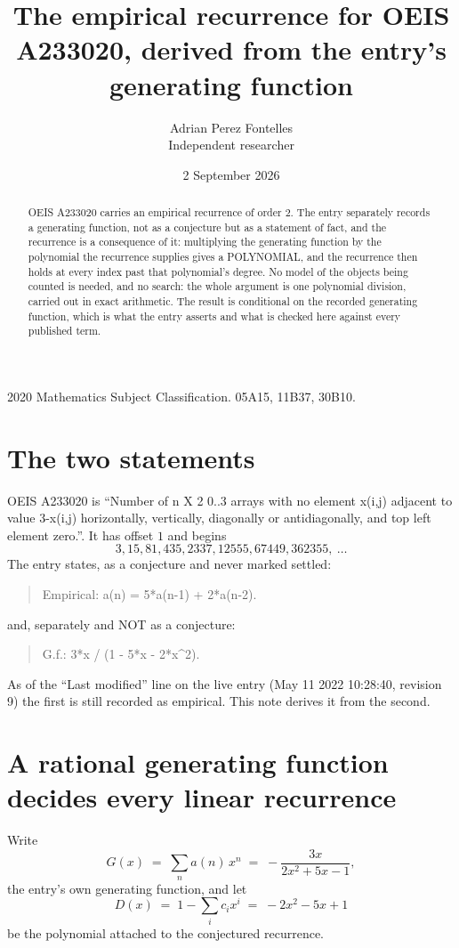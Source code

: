 \documentclass[11pt,a4paper]{article}
\title{The empirical recurrence for OEIS A233020, derived from the entry's generating function}
\author{Adrian Perez Fontelles\\ \small Independent researcher}
\date{2 September 2026}
\theoremstyle{plain}
\theoremstyle{definition}
\begin{document}
\maketitle

\begin{abstract}
OEIS A233020 carries an empirical recurrence of order $2$. The entry separately records a
generating function, not as a conjecture but as a statement of fact, and the recurrence is a
consequence of it: multiplying the generating function by the polynomial the recurrence
supplies gives a POLYNOMIAL, and the recurrence then holds at every index past that
polynomial's degree. No model of the objects being counted is needed, and no search: the
whole argument is one polynomial division, carried out in exact arithmetic. The result is
conditional on the recorded generating function, which is what the entry asserts and what is
checked here against every published term.
\end{abstract}

\noindent\small 2020 Mathematics Subject Classification. 05A15, 11B37, 30B10.\normalsize

\section{The two statements}

OEIS A233020 is ``Number of n X 2 0..3 arrays with no element x(i,j) adjacent to value 3-x(i,j) horizontally, vertically, diagonally or antidiagonally, and top left element zero.''. It has offset $1$ and begins
\[
3, 15, 81, 435, 2337, 12555, 67449, 362355,\ \dots
\]
The entry states, as a conjecture and never marked settled:
\begin{quote}
Empirical: a(n) = 5*a(n-1) + 2*a(n-2).
\end{quote}
and, separately and NOT as a conjecture:
\begin{quote}
G.f.: 3*x / (1 - 5*x - 2*x\^{}2).
\end{quote}
As of the ``Last modified'' line on the live entry (May 11 2022 10:28:40, revision 9) the first is still
recorded as empirical. This note derives it from the second.

\section{A rational generating function decides every linear recurrence}

Write
\[
G(x)\;=\;\sum_{n}a(n)\,x^{n}\;=\;- \frac{3 x}{2 x^{2} + 5 x - 1},
\]
the entry's own generating function, and let
\[
D(x)\;=\;1-\sum_i c_i x^{i}\;=\;- 2 x^{2} - 5 x + 1
\]
be the polynomial attached to the conjectured recurrence.
\end{document}
